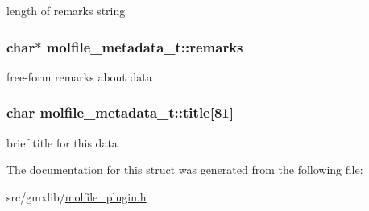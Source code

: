 length of remarks string \hypertarget{structmolfile__metadata__t_a09c612c267d537205b032e45ead23b33}{
\subsubsection[{remarks}]{\setlength{\rightskip}{0pt plus 5cm}char$\ast$ {\bf molfile\-\_\-metadata\-\_\-t\-::remarks}}}\label{structmolfile__metadata__t_a09c612c267d537205b032e45ead23b33}
free-\/form remarks about data \hypertarget{structmolfile__metadata__t_afcb3abfef611009ec3fce80ff105c0d4}{
\subsubsection[{title}]{\setlength{\rightskip}{0pt plus 5cm}char {\bf molfile\-\_\-metadata\-\_\-t\-::title}\mbox{[}81\mbox{]}}}\label{structmolfile__metadata__t_afcb3abfef611009ec3fce80ff105c0d4}
brief title for this data 

\-The documentation for this struct was generated from the following file\-:\begin{DoxyCompactItemize}
\item 
src/gmxlib/\hyperlink{molfile__plugin_8h}{molfile\-\_\-plugin.\-h}\end{DoxyCompactItemize}
